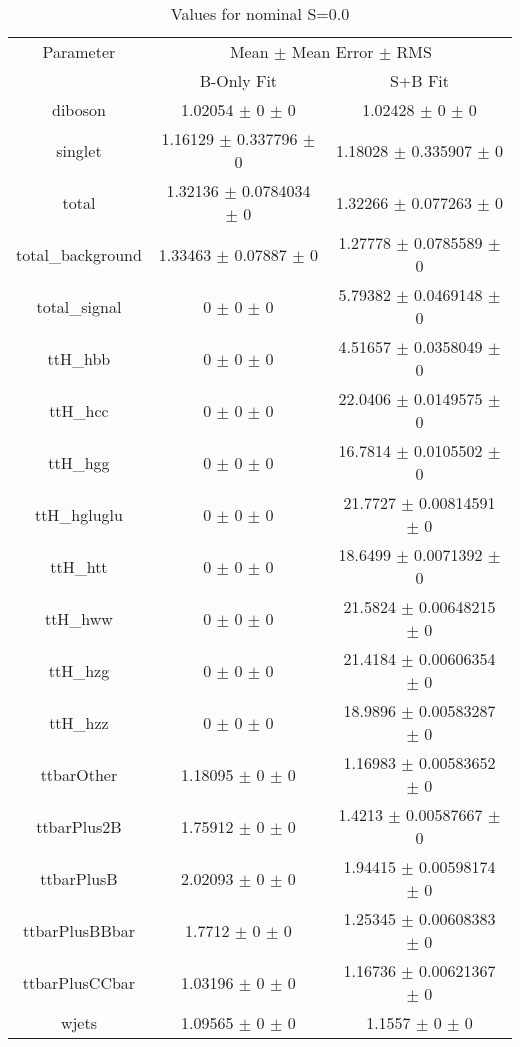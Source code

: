\begin{table}
\centering
\caption{Values for nominal S=0.0}
\begin{tabular}{ccc}
\toprule
Parameter & \multicolumn{2}{c}{Mean $\pm$ Mean Error $\pm$ RMS}\\
 & B-Only Fit & S+B Fit\\
\midrule
diboson & \num{1.02054} $\pm$ \num{0} $\pm$ \num{0} & \num{1.02428} $\pm$ \num{0} $\pm$ \num{0}\\
singlet & \num{1.16129} $\pm$ \num{0.337796} $\pm$ \num{0} & \num{1.18028} $\pm$ \num{0.335907} $\pm$ \num{0}\\
total & \num{1.32136} $\pm$ \num{0.0784034} $\pm$ \num{0} & \num{1.32266} $\pm$ \num{0.077263} $\pm$ \num{0}\\
total\_background & \num{1.33463} $\pm$ \num{0.07887} $\pm$ \num{0} & \num{1.27778} $\pm$ \num{0.0785589} $\pm$ \num{0}\\
total\_signal & \num{0} $\pm$ \num{0} $\pm$ \num{0} & \num{5.79382} $\pm$ \num{0.0469148} $\pm$ \num{0}\\
ttH\_hbb & \num{0} $\pm$ \num{0} $\pm$ \num{0} & \num{4.51657} $\pm$ \num{0.0358049} $\pm$ \num{0}\\
ttH\_hcc & \num{0} $\pm$ \num{0} $\pm$ \num{0} & \num{22.0406} $\pm$ \num{0.0149575} $\pm$ \num{0}\\
ttH\_hgg & \num{0} $\pm$ \num{0} $\pm$ \num{0} & \num{16.7814} $\pm$ \num{0.0105502} $\pm$ \num{0}\\
ttH\_hgluglu & \num{0} $\pm$ \num{0} $\pm$ \num{0} & \num{21.7727} $\pm$ \num{0.00814591} $\pm$ \num{0}\\
ttH\_htt & \num{0} $\pm$ \num{0} $\pm$ \num{0} & \num{18.6499} $\pm$ \num{0.0071392} $\pm$ \num{0}\\
ttH\_hww & \num{0} $\pm$ \num{0} $\pm$ \num{0} & \num{21.5824} $\pm$ \num{0.00648215} $\pm$ \num{0}\\
ttH\_hzg & \num{0} $\pm$ \num{0} $\pm$ \num{0} & \num{21.4184} $\pm$ \num{0.00606354} $\pm$ \num{0}\\
ttH\_hzz & \num{0} $\pm$ \num{0} $\pm$ \num{0} & \num{18.9896} $\pm$ \num{0.00583287} $\pm$ \num{0}\\
ttbarOther & \num{1.18095} $\pm$ \num{0} $\pm$ \num{0} & \num{1.16983} $\pm$ \num{0.00583652} $\pm$ \num{0}\\
ttbarPlus2B & \num{1.75912} $\pm$ \num{0} $\pm$ \num{0} & \num{1.4213} $\pm$ \num{0.00587667} $\pm$ \num{0}\\
ttbarPlusB & \num{2.02093} $\pm$ \num{0} $\pm$ \num{0} & \num{1.94415} $\pm$ \num{0.00598174} $\pm$ \num{0}\\
ttbarPlusBBbar & \num{1.7712} $\pm$ \num{0} $\pm$ \num{0} & \num{1.25345} $\pm$ \num{0.00608383} $\pm$ \num{0}\\
ttbarPlusCCbar & \num{1.03196} $\pm$ \num{0} $\pm$ \num{0} & \num{1.16736} $\pm$ \num{0.00621367} $\pm$ \num{0}\\
wjets & \num{1.09565} $\pm$ \num{0} $\pm$ \num{0} & \num{1.1557} $\pm$ \num{0} $\pm$ \num{0}\\
\bottomrule
\end{tabular}
\end{table}